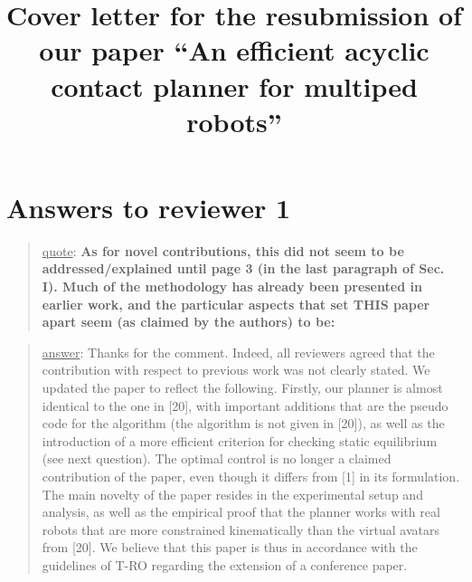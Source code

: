 \documentclass[a4paper]{article}
\author {}
\title {Cover letter for the resubmission of our paper ``An efficient acyclic contact planner for multiped robots''}
\date {}
\newcommand\quot[1]{\begin{quote} \underline{quote}: \textbf{#1}\end{quote}}
\newcommand\as[1]{\begin{quote} \underline{answer}: {#1}\end{quote} }
\begin{document}
\maketitle


\section{Answers to reviewer 1}

\quot {As for novel contributions, this did not seem to be addressed/explained
until page 3 (in the last paragraph of Sec. I). Much of the methodology
has already been presented in earlier work, and the particular aspects
that set THIS paper apart seem (as claimed by the authors) to be: 
}

\as{Thanks for the comment. Indeed, all reviewers agreed that the contribution with respect to previous work was not clearly stated. We updated the paper to reflect the following. Firstly, our planner is almost identical to the one in [20], with important additions that are the pseudo code for the algorithm (the algorithm is not given in [20]), as well as the introduction of a more efficient criterion
for checking static equilibrium (see next question). The optimal control is no longer a claimed contribution of the paper, even though it differs from [1] in its formulation. The main
novelty of the paper resides in the experimental setup and analysis, as well as the empirical proof that the planner works with real robots that are more constrained kinematically than the virtual avatars from [20]. We believe that this paper is thus in accordance with the guidelines of T-RO regarding the extension of a conference paper.}
\end{document}
